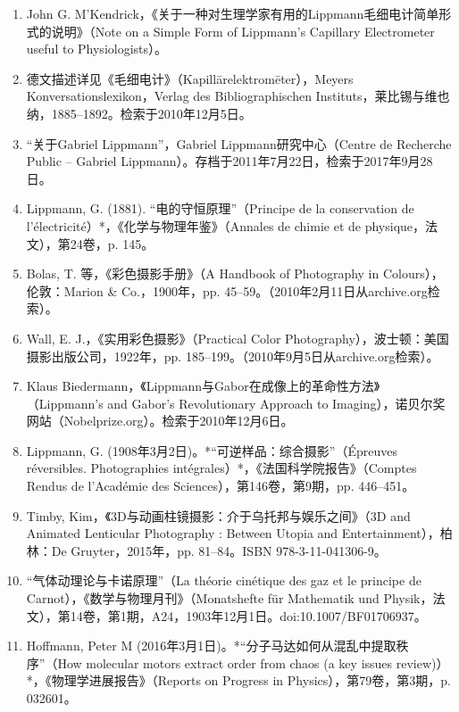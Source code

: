 \begin{enumerate}
\item John G. M'Kendrick，《关于一种对生理学家有用的Lippmann毛细电计简单形式的说明》（Note on a Simple Form of Lippmann's Capillary Electrometer useful to Physiologists）。
\item 德文描述详见《毛细电计》（Kapillārelektromēter），Meyers Konversationslexikon，Verlag des Bibliographischen Instituts，莱比锡与维也纳，1885–1892。检索于2010年12月5日。
\item “关于Gabriel Lippmann”，Gabriel Lippmann研究中心（Centre de Recherche Public – Gabriel Lippmann）。存档于2011年7月22日，检索于2017年9月28日。
\item Lippmann, G. (1881). “电的守恒原理”（Principe de la conservation de l'électricité）*，《化学与物理年鉴》（Annales de chimie et de physique，法文），第24卷，p. 145。
\item Bolas, T. 等，《彩色摄影手册》（A Handbook of Photography in Colours），伦敦：Marion & Co.，1900年，pp. 45–59。（2010年2月11日从archive.org检索）。
\item Wall, E. J.，《实用彩色摄影》（Practical Color Photography），波士顿：美国摄影出版公司，1922年，pp. 185–199。（2010年9月5日从archive.org检索）。
\item Klaus Biedermann，《Lippmann与Gabor在成像上的革命性方法》（Lippmann's and Gabor's Revolutionary Approach to Imaging），诺贝尔奖网站（Nobelprize.org）。检索于2010年12月6日。
\item Lippmann, G. (1908年3月2日)。*“可逆样品：综合摄影”（Épreuves réversibles. Photographies intégrales）*，《法国科学院报告》（Comptes Rendus de l'Académie des Sciences），第146卷，第9期，pp. 446–451。
\item Timby, Kim，《3D与动画柱镜摄影：介于乌托邦与娱乐之间》（3D and Animated Lenticular Photography : Between Utopia and Entertainment），柏林：De Gruyter，2015年，pp. 81–84。ISBN 978-3-11-041306-9。
\item “气体动理论与卡诺原理”（La théorie cinétique des gaz et le principe de Carnot），《数学与物理月刊》（Monatshefte für Mathematik und Physik，法文），第14卷，第1期，A24，1903年12月1日。doi:10.1007/BF01706937。
\item Hoffmann, Peter M (2016年3月1日)。*“分子马达如何从混乱中提取秩序”（How molecular motors extract order from chaos (a key issues review)）*，《物理学进展报告》（Reports on Progress in Physics），第79卷，第3期，p. 032601。
\end{enumerate}